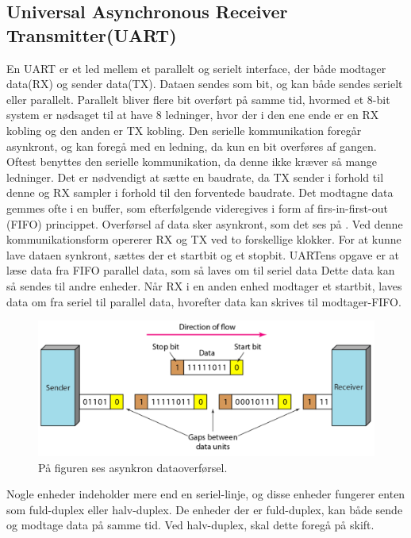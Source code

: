 \subsection{Universal Asynchronous Receiver Transmitter(UART)}
En UART er et led mellem et parallelt og serielt interface, der både modtager data(RX) og sender data(TX). Dataen sendes som bit, og kan både sendes serielt eller parallelt.\newline 
Parallelt bliver flere bit overført på samme tid, hvormed et 8-bit system er nødsaget til at have 8 ledninger, hvor der i den ene ende er en RX kobling og den anden er TX kobling.\newline
Den serielle kommunikation foregår asynkront, og kan foregå med en ledning, da kun en bit overføres af gangen. Oftest benyttes den serielle kommunikation, da denne ikke kræver så mange ledninger.  Det er nødvendigt at sætte en baudrate, da TX sender i forhold til denne og RX sampler i forhold til den forventede baudrate. Det modtagne data gemmes ofte i en buffer, som efterfølgende videregives i form af firs-in-first-out (FIFO) princippet.\newline 
Overførsel af data sker asynkront, som det ses på . Ved denne kommunikationsform opererer RX og TX ved to forskellige klokker. For at kunne lave dataen synkront, sættes der et startbit og et stopbit. UARTens opgave er at læse data fra FIFO parallel data, som så laves om til seriel data Dette data kan så sendes til andre enheder. Når RX i en anden enhed modtager et startbit, laves data om fra seriel til parallel data, hvorefter data kan skrives til modtager-FIFO. 

\begin{figure}[H]
	\centering
	\includegraphics[scale=0.6]{figures/bProblemloesning/asynkron.png}
	\caption{På figuren ses asynkron dataoverførsel.\citep{Jimb02016}}
	\label{fig:asynkron}
\end{figure}

Nogle enheder indeholder mere end en seriel-linje, og disse enheder fungerer enten som fuld-duplex eller halv-duplex. De enheder der er fuld-duplex, kan både sende og modtage data på samme tid. Ved halv-duplex, skal dette foregå på skift. 